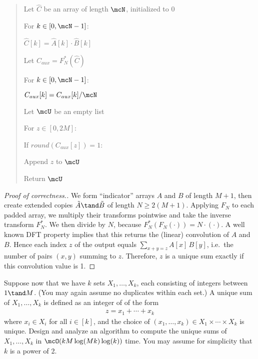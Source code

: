 \documentclass[10pt]{article}
\begin{document}
\begin{quote}
\begin{steps}
  \item Let $ \hat C $ be an array of length $ \mcN $, initialized to 0
  \item For $ k \in [0,\mcN-1] $: 
  \begin{steps}
    \item $ \hat C[k] = \hat A[k] \cdot \hat B[k] $
  \end{steps}

  \item Let $ C_{aux} = F_N^*(\hat C) $
  \item For $ k \in [0,\mcN-1] $: 
  \begin{steps}
    \item $ C_{aux}[k] = C_{aux}[k] / \mcN $
  \end{steps}
  \item Let $ \mcU $ be an empty list
  \item For $ z\in [0,2M] $:
  \begin{steps}
    \item If $ round(C_{aux}[z]) = 1 $:
    \begin{steps}
      \item Append $ z $ to $ \mcU $
    \end{steps}
  \end{steps}
  \item Return $ \mcU $
\end{steps}
\end{quote}

\begin{proof}[Proof of correctness.]
  We form ``indicator'' arrays $A$ and $B$ of length $M+1$, then create extended copies $ \tilde A\tand \tilde B $ of length $N \ge 2(M+1)$.
Applying $F_N$ to each padded array,
we multiply their transforms pointwise and take the inverse transform $F_N^*$. We then
divide by $N$, because $F_N^*(F_N(\cdot)) = N \cdot (\cdot)$.
A well known DFT property implies that this returns the (linear) convolution of $A$ and $B$.
Hence each index $z$ of the output equals
$\sum_{x+y=z} A[x] \, B[y]$, i.e.\ the number of pairs $(x,y)$ summing to $z$.
Therefore, $z$ is a unique sum exactly if this convolution value is 1.
\end{proof}

\pagebreak

\begin{subexercise}
  \item Suppose now that we have $ k $ sets $ X_1,\ldots, X_k $, each consisting of integers between
  $ 1\tand M $. (You may again assume no duplicates within each set.) A unique sum of $ X_1,\ldots, X_k $ is defined as an integer of of the form \begin{align*}
    z = x_1 + \cdots + x_k
  \end{align*} where $ x_i\in X_i $ for all $ i\in [k] $, and the choice of $ (x_1,\ldots,x_k) \in X_1\times \cdots \times X_k $ is unique. Design and analyze an algorithm to compute the unique sums of $ X_1,\ldots,X_k $ in $ \mcO(kM\log(Mk)\log(k)) $ time. You may assume for simplicity that $ k $ is a power of 2.
\end{subexercise}
\end{document}
